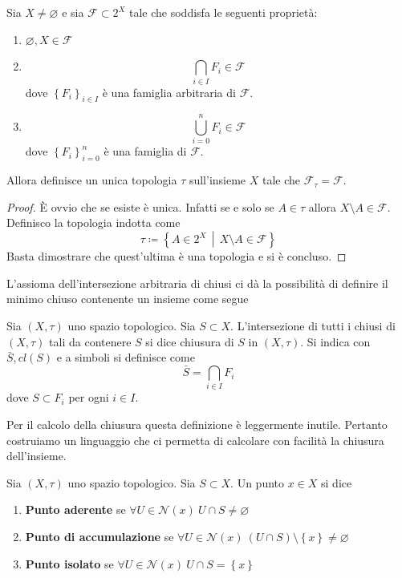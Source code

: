 \begin{lemma}
	Sia $X \neq \varnothing$ e sia $\mathcal{F} \subset 2^X$ tale che soddisfa le seguenti proprietà:
		\begin{enumerate}
		\item $\varnothing, X \in \mathcal{F}$
		\item 
			\begin{equation*}
				\bigcap_{i \in I} F_i \in \mathcal{F}
			\end{equation*}
		dove $\left\{F_i\right\}_{i\in I}$ è una famiglia arbitraria di $\mathcal{F}$.
		\item 
			\begin{equation*}
				\bigcup^{n}_{i = 0} F_i \in \mathcal{F}
			\end{equation*}
		dove $\left\{F_i\right\}^n_{i=0}$ è una famiglia di $\mathcal{F}$.
	\end{enumerate}
	Allora definisce un unica topologia $\tau$ sull'insieme $X$ tale che $\mathcal{F}_\tau = \mathcal{F}$.
\end{lemma}
\begin{proof}
	È ovvio che se esiste è unica. Infatti se e solo se $A \in \tau$ allora $X \setminus A \in \mathcal{F}$. Definisco la topologia indotta come 
	\begin{equation*}
		\tau \coloneqq \left\{ A \in 2^X \,\middle|\, X \setminus A \in \mathcal{F} \right\}
	\end{equation*}
	Basta dimostrare che quest'ultima è una topologia e si è concluso.
\end{proof}

L'assioma dell'intersezione arbitraria di chiusi ci dà la possibilità di definire il minimo chiuso contenente un insieme come segue
\begin{definition}
	Sia $(X, \tau)$ uno spazio topologico. Sia $S \subset X$. L'intersezione di tutti i chiusi di $(X,\tau)$ tali da contenere $S$ si dice chiusura di $S$ in $(X, \tau)$. Si indica con $\bar{S}, cl(S)$ e a simboli si definisce come 
	\begin{equation*}
		\bar{S} = \bigcap_{i \in I} F_i
	\end{equation*}
	dove $S \subset F_i$ per ogni $i \in I$.
\end{definition}
Per il calcolo della chiusura questa definizione è leggermente inutile. Pertanto costruiamo un linguaggio che ci permetta di calcolare con facilità la chiusura dell'insieme.
\begin{definition}
		Sia $(X, \tau)$ uno spazio topologico. Sia $S \subset X$. Un punto $x \in X$ si dice
	\begin{enumerate}
		\item \textbf{Punto aderente} se $\forall U \in \mathcal{N}(x)\ U \cap S \neq \varnothing$
		\item \textbf{Punto di accumulazione} se $\forall U \in \mathcal{N}(x)\ (U \cap S) \setminus \left\{x\right\} \neq \varnothing$
		\item \textbf{Punto isolato} se $\forall U \in \mathcal{N}(x)\ U \cap S = \left\{x\right\}$
	\end{enumerate}
\end{definition}

